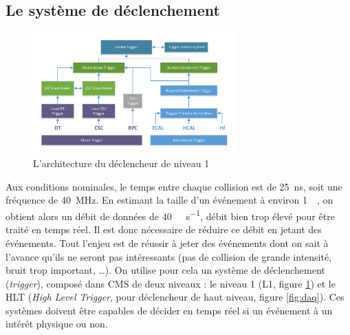 
\subsection{Le système de déclenchement}

\begin{figure}[b!] \centering
  \includegraphics[width=0.7\textwidth]{chapitre2/figs/L1.pdf}
  \caption{L'architecture du déclencheur de niveau 1}
  \label{fig:l1}
\end{figure}

Aux conditions nominales, le temps entre chaque collision est de \SI{25}{\ns}, soit une fréquence de \SI{40}{\mega\hertz}. En estimant la taille d'un événement à environ \SI{1}{\mega\octet}, on obtient alors un débit de données de \SI{40}{\tera\octet\per\second}, débit bien trop élevé pour être traité en temps réel. Il est donc nécessaire de réduire ce débit en jetant des événements. Tout l'enjeu est de réussir à jeter des événements dont on sait à l'avance qu'ils ne seront pas intéressants (pas de collision de grande intensité, bruit trop important, \ldots). On utilise pour cela un système de déclenchement (\emph{trigger}), composé dans CMS de deux niveaux : le niveau 1 (L1, figure \ref{fig:l1}) et le HLT (\emph{High Level Trigger}, pour déclencheur de haut niveau, figure \ref{fig:daq}). Ces systèmes doivent être capables de décider en temps réel si un événement à un intérêt physique ou non.

